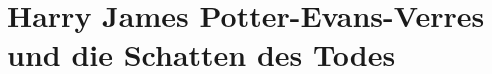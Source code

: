 \part{Harry James Potter-Evans-Verres und die Schatten des Todes}

% 
% 
% 
% 
% 
% 
% 
% 
% 
% 
% 
% 
% 
% 
% 
% 
% 
% 
% 
% 
% 
% 
% 
% 
% 
% 
% 
% 
% 
% 
% 
% 
% 
% 
% 
% 
% 
% 
% 
% 
% 
% 
% 
% 
% 
% 
% 
% 
